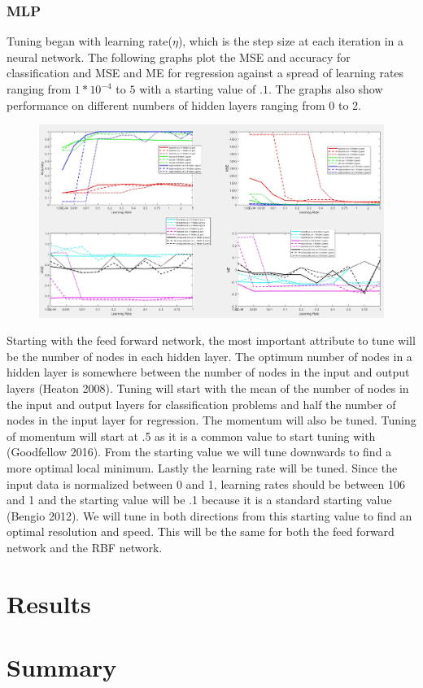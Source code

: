 \documentclass[twoside,11pt]{article}
\begin{document}
\subsubsection{MLP}
Tuning began with learning rate($\eta$), which is the step size at each iteration in a neural network. The following graphs plot the MSE and accuracy for classification and MSE and ME for regression against a spread of learning rates ranging from $1*10^{-4}$ to $5$ with a starting value of $.1$. The graphs also show performance on different numbers of hidden layers ranging from 0 to 2. \\
\begin{figure}[h]
	\centering
	\includegraphics[width=6in]{LearningRateTuning2MultiplierGraphs.JPG}
\end{figure}

Starting with the feed forward network, the most important attribute to tune will be the number of nodes in each hidden layer. The optimum number of nodes in a hidden layer is somewhere between the number of nodes in the input and output layers (Heaton 2008). Tuning will start with the mean of the number of nodes in the input and output layers for classification problems and half the number of nodes in the input layer for regression. The momentum will also be tuned. Tuning of momentum will start at .5 as it is a common value to start tuning with (Goodfellow 2016). From the starting value we will tune downwards to find a more optimal local minimum. Lastly the learning rate will be tuned. Since the input data is normalized between 0 and 1, learning rates should be between 106 and 1 and the starting value will be .1 because it is a standard starting value (Bengio 2012). We will tune in both directions from this starting value to find an optimal resolution and speed. This will be the same for both the feed forward network and the RBF network.

\section{Results}

\section{Summary}



\end{document}
